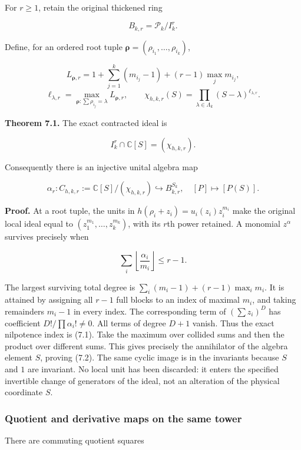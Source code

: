 \documentclass[
]{article}
\begin{document}
For \(r\ge1\), retain the original thickened ring

\[B_{k,r}=\mathcal P_k/I_k^r.\]

Define, for an ordered root tuple
\(\boldsymbol\rho=(\rho_{i_1},\ldots,\rho_{i_k})\),

\[L_{\boldsymbol\rho,r}=1+\sum_{j=1}^k(m_{i_j}-1)+(r-1)\max_jm_{i_j},\]
\[\ell_{\lambda,r}=\max_{\boldsymbol\rho:\sum\rho_{i_j}=\lambda}L_{\boldsymbol\rho,r},\qquad
\boxed{\chi_{h,k,r}(S)=\prod_{\lambda\in\Lambda_k}(S-\lambda)^{\ell_{\lambda,r}}.}\tag{7.1}\]

\textbf{Theorem 7.1.} The exact contracted ideal is

\[\boxed{I_k^r\cap\mathbb C[S]=(\chi_{h,k,r}).}\tag{7.2}\]

Consequently there is an injective unital algebra map

\[\boxed{\alpha_r:C_{h,k,r}:=\mathbb C[S]/(\chi_{h,k,r})\hookrightarrow B_{k,r}^{S_k},\quad[P]\mapsto[P(S)].}\tag{7.3}\]

\textbf{Proof.} At a root tuple, the units in
\(h(\rho_i+z_i)=u_i(z_i)z_i^{m_i}\) make the original local ideal equal
to \((z_1^{m_1},\ldots,z_k^{m_k})\), with its \(r\)th power retained. A
monomial \(z^\alpha\) survives precisely when

\[\sum_i\left\lfloor\frac{\alpha_i}{m_i}\right\rfloor\le r-1.\tag{7.4}\]

The largest surviving total degree is \(\sum_i(m_i-1)+(r-1)\max_i m_i\).
It is attained by assigning all \(r-1\) full blocks to an index of
maximal \(m_i\), and taking remainders \(m_i-1\) in every index. The
corresponding term of \((\sum z_i)^D\) has coefficient
\(D!/\prod\alpha_i!\ne0\). All terms of degree \(D+1\) vanish. Thus the
exact nilpotence index is (7.1). Take the maximum over collided sums and
then the product over different sums. This gives precisely the
annihilator of the algebra element \(S\), proving (7.2). The same cyclic
image is in the invariants because \(S\) and \(1\) are invariant. No
local unit has been discarded: it enters the specified invertible change
of generators of the ideal, not an alteration of the physical coordinate
\(S\).

\subsubsection{Quotient and derivative maps on the same
tower}\label{quotient-and-derivative-maps-on-the-same-tower}

There are commuting quotient squares
\end{document}

